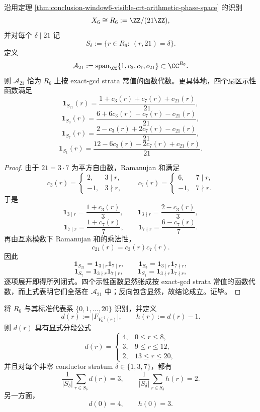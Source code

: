 \begin{theorem}\label{thm:conclusion-window6-ramanujan-sector-algebra-on-crt-layer}
沿用定理 \ref{thm:conclusion-window6-visible-crt-arithmetic-phase-space} 的识别
\[
X_6\cong R_6:=\ZZ/(21\ZZ),
\]
并对每个 \(\delta\mid 21\) 记
\[
S_\delta:=\{r\in R_6:\ (r,21)=\delta\}.
\]
定义
\[
\mathcal A_{21}:=\operatorname{span}_{\CC}\{1,c_3,c_7,c_{21}\}\subset \CC^{R_6}.
\]
则 \(\mathcal A_{21}\) 恰为 \(R_6\) 上按 exact-gcd strata 常值的函数代数。更具体地，四个扇区示性函数满足
\[
\mathbf 1_{S_{21}}(r)=\frac{1+c_3(r)+c_7(r)+c_{21}(r)}{21},
\]
\[
\mathbf 1_{S_3}(r)=\frac{6+6c_3(r)-c_7(r)-c_{21}(r)}{21},
\]
\[
\mathbf 1_{S_7}(r)=\frac{2-c_3(r)+2c_7(r)-c_{21}(r)}{21},
\]
\[
\mathbf 1_{S_1}(r)=\frac{12-6c_3(r)-2c_7(r)+c_{21}(r)}{21}.
\]
\end{theorem}

\begin{proof}
由于 \(21=3\cdot 7\) 为平方自由数，Ramanujan 和满足
\[
c_3(r)=
\begin{cases}
2,& 3\mid r,\\
-1,& 3\nmid r,
\end{cases}
\qquad
c_7(r)=
\begin{cases}
6,& 7\mid r,\\
-1,& 7\nmid r.
\end{cases}
\]
于是
\[
\mathbf 1_{3\mid r}=\frac{1+c_3(r)}{3},
\qquad
\mathbf 1_{3\nmid r}=\frac{2-c_3(r)}{3},
\]
\[
\mathbf 1_{7\mid r}=\frac{1+c_7(r)}{7},
\qquad
\mathbf 1_{7\nmid r}=\frac{6-c_7(r)}{7}.
\]
再由互素模数下 Ramanujan 和的乘法性，
\[
c_{21}(r)=c_3(r)c_7(r).
\]
因此
\[
\mathbf 1_{S_{21}}=\mathbf 1_{3\mid r}\mathbf 1_{7\mid r},\qquad
\mathbf 1_{S_3}=\mathbf 1_{3\mid r}\mathbf 1_{7\nmid r},
\]
\[
\mathbf 1_{S_7}=\mathbf 1_{3\nmid r}\mathbf 1_{7\mid r},\qquad
\mathbf 1_{S_1}=\mathbf 1_{3\nmid r}\mathbf 1_{7\nmid r},
\]
逐项展开即得所列闭式。四个示性函数显然张成按 exact-gcd strata 常值的函数代数，而上式表明它们全落在 \(\mathcal A_{21}\) 中；反向包含显然，故结论成立。证毕。
\end{proof}

\begin{theorem}\label{thm:conclusion-window6-hidden-multiplicity-neutrality-on-nonzero-strata}
将 \(R_6\) 与其标准代表系 \(\{0,1,\dots,20\}\) 识别，并定义
\[
d(r):=\bigl|F_{V_6^{-1}(r)}\bigr|,
\qquad
h(r):=d(r)-1.
\]
则 \(d(r)\) 具有显式分段公式
\[
d(r)=
\begin{cases}
4,& 0\le r\le 8,\\
3,& 9\le r\le 12,\\
2,& 13\le r\le 20,
\end{cases}
\]
并且对每个非零 conductor stratum \(\delta\in\{1,3,7\}\)，都有
\[
\frac1{|S_\delta|}\sum_{r\in S_\delta} d(r)=3,
\qquad
\frac1{|S_\delta|}\sum_{r\in S_\delta} h(r)=2.
\]
另一方面，
\[
d(0)=4,\qquad h(0)=3.
\]
\end{theorem}

